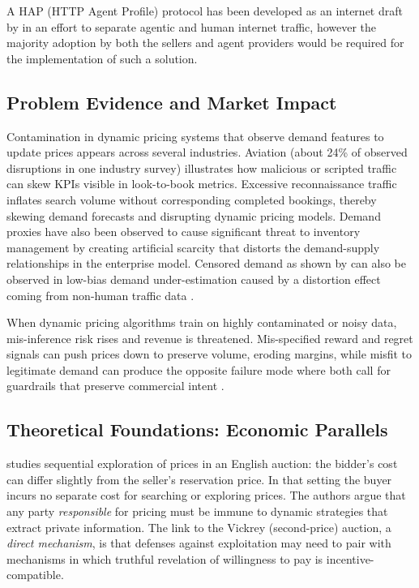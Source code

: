 A HAP (HTTP Agent Profile) protocol has been developed as an internet draft by \textcite{dhir_http_2025} in an effort to separate agentic and human internet traffic, however the majority adoption by both the sellers and agent providers would be required for the implementation of such a solution.

\subsection{Problem Evidence and Market Impact}

Contamination in dynamic pricing systems that observe demand features to update prices appears across several industries. Aviation (about 24\% of observed disruptions in one industry survey) illustrates how malicious or scripted traffic can skew KPIs visible in look-to-book metrics. Excessive reconnaissance traffic inflates search volume without corresponding completed bookings, thereby skewing demand forecasts and disrupting dynamic pricing models. Demand proxies have also been observed to cause significant threat to inventory management by creating artificial scarcity that distorts the demand-supply relationships in the enterprise model. Censored demand as shown by \textcite{amjad_censored_2017} can also be observed in low-bias demand under-estimation caused by a distortion effect coming from non-human traffic data \parencite{imperva_rapid_2025}.

When dynamic pricing algorithms train on highly contaminated or noisy data, mis-inference risk rises and revenue is threatened. Mis-specified reward and regret signals can push prices down to preserve volume, eroding margins, while misfit to legitimate demand can produce the opposite failure mode where both call for guardrails that preserve commercial intent \parencite{mullapudi_reinforcement_2025}.



\subsection{Theoretical Foundations: Economic Parallels}


\textcite{varian_economic_1995} studies sequential exploration of prices in an English auction: the bidder's cost can differ slightly from the seller's reservation price. In that setting the buyer incurs no separate cost for searching or exploring prices. The authors argue that any party \emph{responsible} for pricing must be immune to dynamic strategies that extract private information. The link to the Vickrey (second-price) auction, a \textit{direct mechanism}, is that defenses against exploitation may need to pair with mechanisms in which truthful revelation of willingness to pay is incentive-compatible.

